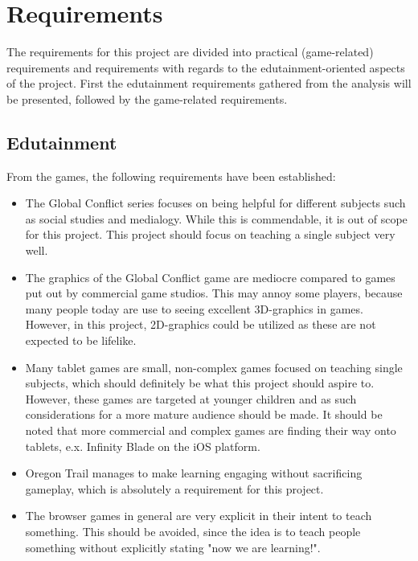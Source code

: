\section{Requirements}
\label{sec:requirements}

The requirements for this project are divided into practical (game-related) requirements and requirements with regards to the edutainment-oriented 
aspects of the project. First the edutainment requirements gathered from the analysis will be presented, followed by the game-related requirements.

\subsection{Edutainment}

From the games, the following requirements have been established: 

\begin{itemize}
	\item The Global Conflict series focuses on being helpful for different subjects such as social studies and medialogy. While this is commendable, it 
	is out of scope for this project. This project should focus on teaching a single subject very well.

	\item The graphics of the Global Conflict game are mediocre compared to games put out by commercial game studios. This may annoy some players, 
	because many people today are use to seeing excellent 3D-graphics in games. However, in this project, 2D-graphics could be utilized as these are not 
	expected to be lifelike.

	\item Many tablet games are small, non-complex games focused on teaching single subjects, which should definitely be what this project should aspire 
	to. However, these games are targeted at younger children and as such considerations for a more mature audience should be made. It should be noted 
	that more commercial and complex games are finding their way onto tablets, e.x. Infinity Blade on the iOS platform.

	\item Oregon Trail manages to make learning engaging without sacrificing gameplay, which is absolutely a requirement for this project.

	\item The browser games in general are very explicit in their intent to teach something. This should be avoided, since the idea is to teach people 
	something without explicitly stating "now we are learning!". 
\end{itemize}

